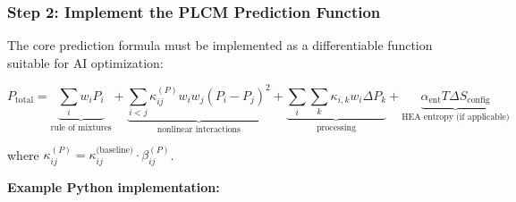 \documentclass[12pt,a4paper]{article}
\begin{document}
	\subsubsection{Step 2: Implement the PLCM Prediction Function}
	
	The core prediction formula must be implemented as a differentiable function suitable for AI optimization:
	
	\begin{equation}
		P_{\text{total}} = \underbrace{\sum_i w_i P_i}_{\text{rule of mixtures}} 
		+ \underbrace{\sum_{i<j} \kappa_{ij}^{(P)} w_i w_j (P_i - P_j)^2}_{\text{nonlinear interactions}}
		+ \underbrace{\sum_i \sum_k \kappa_{i,k} w_i \Delta P_k}_{\text{processing}}
		+ \underbrace{\alpha_{\text{ent}} T \Delta S_{\text{config}}}_{\text{HEA entropy (if applicable)}}
		\label{eq:plcm-prediction}
	\end{equation}
	
	where \(\kappa_{ij}^{(P)} = \kappa_{ij}^{\text{(baseline)}} \cdot \beta_{ij}^{(P)}\).
	
	\textbf{Example Python implementation:}
	
\end{document}
